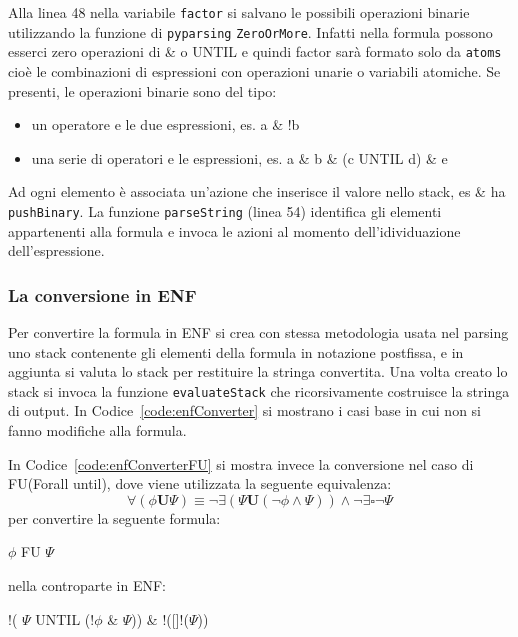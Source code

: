 \documentclass[a4paper, 10pt]{article}
\numberwithin{equation}{theor}
\begin{document}
Alla linea 48 nella variabile \texttt{factor} si salvano le possibili operazioni binarie utilizzando la funzione di \texttt{pyparsing} \texttt{ZeroOrMore}.
Infatti nella formula possono esserci zero operazioni di \& o UNTIL e quindi factor sarà formato solo da \texttt{atoms} cioè le combinazioni di espressioni con operazioni unarie o variabili atomiche.
Se presenti, le operazioni binarie sono del tipo:
\begin{itemize}
  \item un operatore e le due espressioni, es. a \& !b
  \item una serie di operatori e le espressioni, es. a \& b \& (c UNTIL d) \& e
\end{itemize}
Ad ogni elemento è associata un'azione che inserisce il valore nello stack, es \& ha \texttt{pushBinary}.
La funzione \texttt{parseString} (linea 54) identifica gli elementi appartenenti alla formula e invoca le azioni al momento dell'idividuazione dell'espressione.

\subsubsection{La conversione in ENF}
Per convertire la formula in \ac{ENF} si crea con stessa metodologia usata nel parsing uno stack contenente gli elementi della formula in notazione postfissa,
e in aggiunta si valuta lo stack per restituire la stringa convertita.
Una volta creato lo stack si invoca la funzione \texttt{evaluateStack} che ricorsivamente costruisce la stringa di output.
In Codice~\ref{code:enfConverter} si mostrano i casi base in cui non si fanno modifiche alla formula.

In Codice~\ref{code:enfConverterFU} si mostra invece la conversione nel caso di FU(Forall until), dove viene utilizzata la seguente equivalenza:
$$\forall(\phi \boldsymbol{U} \Psi) \equiv \neg \exists( \Psi \boldsymbol{U} (\neg \phi \wedge \Psi)  )\wedge \neg\exists\square\neg\Psi$$
per convertire la seguente formula:

\centerline{$\phi$ FU $\Psi$}
nella controparte in \ac{ENF}:
\centerline{!( $\Psi$ UNTIL (!$\phi$ \& $\Psi$)) \& !([]!($\Psi$))}


\end{document}
